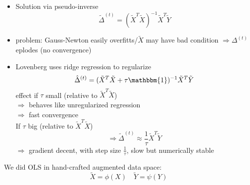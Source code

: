 \documentclass[11pt]{article}
\begin{document}
    \begin{itemize}
      \item Solution via pseudo-inverse
      \begin{equation*}
        \tilde{\Delta}^{(t)}=(\tilde{X}^T\tilde{X})^{-1}\tilde{X}^T\tilde{Y}
      \end{equation*}
      \item problem: Gauss-Newton easily overfitts/$\tilde{X}$ may have bad condition
      $\Rightarrow \Delta^{(t)}$ eplodes (no convergence)
      \item Lovenberg uses ridge regression to regularize
      \begin{equation*}
        \hat{\Delta}^{(t)}=(\tilde{X}^T\tilde{X}+\tau \mathbbm{1})^{-1}\tilde{X}^T\tilde{Y}
      \end{equation*}
      effect if $\tau$ small (relative to $\tilde{X}^T\tilde{X}$) \\
      $\Rightarrow$ behaves like unregularized regression \\
      $\Rightarrow$ fast convergence \\
      If $\tau$ big (relative to $\tilde{X}^T\tilde{X}$)
      \begin{equation*}
        \Rightarrow \tilde{\Delta}^{(t)} \approx \frac{1}{\tau} \tilde{X}^T\tilde{Y}
      \end{equation*}
      $\Rightarrow$ gradient decent, with step size $\frac{1}{\tau}$, slow but numerically stable
    \end{itemize}





    We did OLS in hand-crafted augmented data space:
    \begin{equation*}
      \tilde{X}=\phi(X) \quad \tilde{Y}=\psi(Y)
    \end{equation*}
\end{document}
